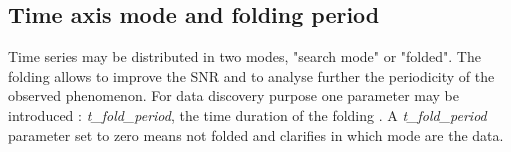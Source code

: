 \documentclass[11pt,a4paper]{ivoa}
\begin{document}
\subsection{Time axis mode and folding period }
Time series may be distributed in two modes, "search mode" or "folded". 
The folding allows to improve the SNR and to analyse further the periodicity of the observed phenomenon.
For data discovery  purpose one parameter may be introduced : \emph{t\_fold\_period}, the time duration of the folding .
A \emph{t\_fold\_period} parameter set to zero means not folded  and clarifies in which mode are the data. 
% 
\end{document}
